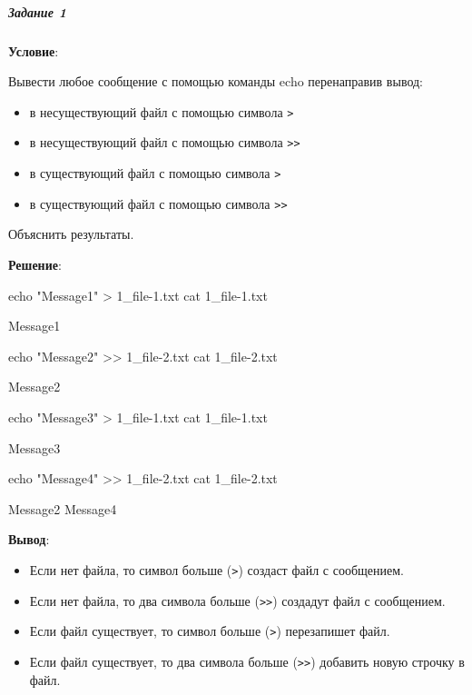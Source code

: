 \subparagraph{Задание 1} \textbf{Условие}:

Вывести любое сообщение с помощью команды echo перенаправив вывод:

\begin{itemize}
    \item в несуществующий файл с помощью символа \verb|>|
    \item в несуществующий файл с помощью символа \verb|>>|
    \item в существующий файл с помощью символа \verb|>|
    \item в существующий файл с помощью символа \verb|>>|
\end{itemize}

Объяснить результаты.

\textbf{Решение}:

\begin{BashBox}
echo "Message1" > 1_file-1.txt
cat 1_file-1.txt
\end{BashBox}

\begin{OutBox}
Message1
\end{OutBox}

\begin{BashBox}
echo "Message2" >> 1_file-2.txt
cat 1_file-2.txt
\end{BashBox}

\begin{OutBox}
Message2
\end{OutBox}

\begin{BashBox}
echo "Message3" > 1_file-1.txt
cat 1_file-1.txt
\end{BashBox}

\begin{OutBox}
Message3
\end{OutBox}

\begin{BashBox}
echo "Message4" >> 1_file-2.txt
cat 1_file-2.txt
\end{BashBox}

\begin{OutBox}
Message2
Message4
\end{OutBox}

\textbf{Вывод}:

\begin{itemize}
    \item Если нет файла, то символ больше (\verb|>|) создаст файл с сообщением.
    \item Если нет файла, то два символа больше (\verb|>>|) создадут файл с сообщением.
    \item Если файл существует, то символ больше (\verb|>|) перезапишет файл.
    \item Если файл существует, то два символа больше (\verb|>>|) добавить новую строчку в файл.
\end{itemize}

